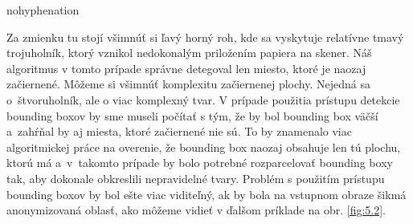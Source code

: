 \begin{hyphenrules}{nohyphenation}
\begin{figure}[H]
\begin{minipage}[b]{.5\linewidth}
\end{minipage}
\end{figure}

Za zmienku tu stojí všimnúť si ľavý horný roh, kde sa vyskytuje relatívne tmavý trojuholník, ktorý vznikol nedokonalým priložením papiera na skener. Náš algoritmus v tomto prípade správne detegoval len miesto, ktoré je naozaj začiernené. Môžeme si všimnúť komplexitu začiernenej plochy. Nejedná sa o~štvoruholník, ale o viac komplexný tvar. V prípade použitia prístupu detekcie bounding boxov by sme museli počítať s tým, že by bol bounding box väčší a~zahŕňal by aj miesta, ktoré začiernené nie sú. To by znamenalo viac algoritmickej práce na overenie, že bounding box naozaj obsahuje len tú plochu, ktorú má a~v~takomto prípade by bolo potrebné rozparcelovať bounding boxy tak, aby dokonale obkreslili nepravidelné tvary. Problém s použitím prístupu bounding boxov by bol ešte viac viditeľný, ak by bola na vstupnom obraze šikmá anonymizovaná oblasť, ako môžeme vidieť v ďalšom príklade na obr. \ref{fig:5.2}.


\end{hyphenrules}
